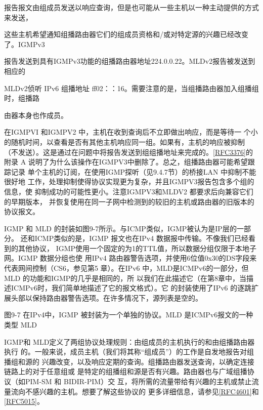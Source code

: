 报告报文由组成员发送以响应查询，但是也可能从一些主机以一种主动提供的方式来发送，

这些主机希望通知组播路由器它们的组成员资格和/或对特定源的兴趣已经改变了。IGMPv3

报告发送到具有IGMPv3功能的组播路由器地址224.0.0.22。MLDv2报告被发送到相应的

MLDv2侦听 IPv6 组播地址 ff02：：16。需要注意的是，当组播路由器加入组播组时，组播路

由器本身也作成员。


\begin{tcolorbox}
    在IGMPVI 和IGMPV2 中，主机在收到查询后不立即做出响应，而是等待一
    个小的随机时间，以查看是否有其他主机响应同一组。如果有，主机的响应被抑制
    （不发送）。这是通过在问题中将报告发送到组组播地址来完成的。\href{https://www.rfc-editor.org/rfc/rfc3376}{[RFC3376]}的附录
    A 说明了为什么该操作在IGMPV3中删除了。总之，组播路由器可能希望跟踪记录
    单个主机的订阅，在使用IGMP探听（见9.4.7节）的桥接LAN 中抑制不能很好地
    工作，处理抑制使得协议实现更为复杂，并且IGMPV3报告包含多个组的信息，使
    抑制成功的可能性更小。注意IGMPV3和MLDV2 都要求后向兼容它们的早期版本，
    并恢复使用在同一子网中检测到的较旧的主机或路由器的旧版本的协议报文。
\end{tcolorbox}

IGMP 和 MLD 的封装如图9-7所示。与ICMP类似，IGMP被认为是IP层的一部分。
还和ICMP类似的是，IGMP 报文也在IPv4 数据报中传输。不像我们已经看到的其他协议，
IGMP使用一个固定的为1的TTL值，所以数据分组仅限于本地子网。IGMP 数据分组也使
用IPv4 路由器警告选项，并使用6位值0x30的DS字段来代表网间控制（CS6，参见第5
章）。在IPv6 中，MLD是ICMPv6的一部分，但 MLD 的功能和IGMP的几乎是相同的，所
以我们在此描述它（在第8章中，当描述ICMPv6时，我们简单地描述了它的报文格式）。它
的封装使用了IPv6 的逐跳扩展头部以保持路由器警告选项。在许多情况下，源列表是空的。

图9-7 在IPv4中，IGMP 被封装为一个单独的协议。MLD 是ICMPv6报文的一种类型
MLD


IGMP和 MLD定义了两组协议处理规则：由组成员的主机执行的和由组播路由器执行
的。一般来说，成员主机（我们将其称“组成员”）的工作是自发地报告对组播组和源的
兴趣改变，以及响应定期的查询。组播路由器发送查询，以确定连接链路上的对于任意组或
是特定的组播组和源是否有兴趣。路由器也与广域组播协议（如PIM-SM 和 BIDIR-PIM）交
互，将所需的流量带给有兴趣的主机或禁止流量流向不感兴趣的主机。想要了解这些协议的
更多详细信息，请参见\href{https://www.rfc-editor.org/rfc/rfc4601}{[RFC4601]}和 \href{https://www.rfc-editor.org/rfc/rfc5015}{[RFC5015]}。

